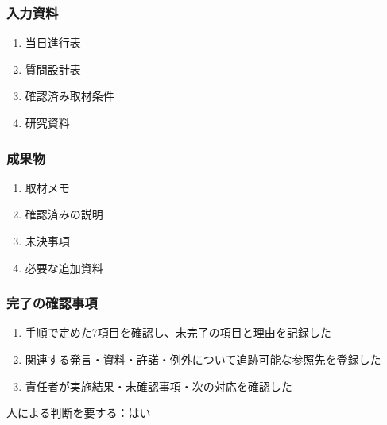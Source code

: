 \documentclass[a4paper,11pt]{article}
\begin{document}
\subsubsection*{入力資料}
\begin{enumerate}[leftmargin=2em,itemsep=0.35em]
\item 当日進行表
\item 質問設計表
\item 確認済み取材条件
\item 研究資料
\end{enumerate}
\subsubsection*{成果物}
\begin{enumerate}[leftmargin=2em,itemsep=0.35em]
\item 取材メモ
\item 確認済みの説明
\item 未決事項
\item 必要な追加資料
\end{enumerate}
\subsubsection*{完了の確認事項}
\begin{enumerate}[leftmargin=2em,itemsep=0.35em]
\item 手順で定めた7項目を確認し、未完了の項目と理由を記録した
\item 関連する発言・資料・許諾・例外について追跡可能な参照先を登録した
\item 責任者が実施結果・未確認事項・次の対応を確認した
\end{enumerate}
\par 人による判断を要する：はい\par\medskip
\end{document}
